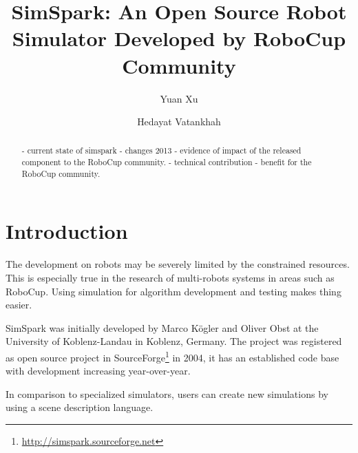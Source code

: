 \documentclass{llncs}
\begin{document}
\title{SimSpark: An Open Source Robot Simulator Developed by RoboCup Community}

\author{Yuan Xu \and Hedayat Vatankhah}


\maketitle

\begin{abstract}
  - current state of simspark
  - changes 2013
  - evidence of impact of the released component to the RoboCup community.
  - technical contribution
  - benefit for the RoboCup community.
\end{abstract}

\section{Introduction}
The development on robots may be severely limited by the constrained resources.
This is especially true in the research of multi-robots systems in areas such as RoboCup.
Using simulation for algorithm development and testing makes thing easier.

SimSpark was initially developed by Marco Kögler and Oliver Obst at the University of Koblenz-Landau in Koblenz, Germany\cite{OR05}.
The project was registered as open source project in SourceForge\footnote{\url{http://simspark.sourceforge.net}} in 2004, it has an established code base with development increasing year-over-year\cite{Boedecker2008,usermanual}.

In comparison to specialized simulators, users can create new simulations by using a scene description language.
\end{document}
